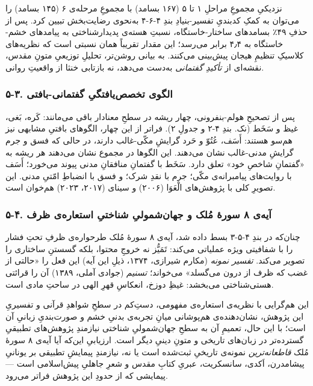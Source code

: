 \documentclass[12pt,a4paper]{article}
\begin{document}
\begin{RTL}
\begin{otherlanguage}{persian}
نزدیکیِ مجموعِ مراحلِ ۱ تا ۵ (۱۶۷ بسامد) با مجموعِ مرحله‌ی ۶ (۱۴۵ بسامد) را
می‌توان به کمکِ کدبندیِ تفسیر-بنیادِ بندِ ۴-۶-۴ به‌نحوی رضایت‌بخش تبیین کرد. پس
از حذفِ ۴۹٪ بسامدهای ساختار-خاستگاه، نسبتِ هسته‌ی پدیدارشناختی به پیامدهای
خشم-خاستگاه به ۴٫۴ برابر می‌رسد؛ این مقدار تقریباً همان نسبتی است که
نظریه‌های کلاسیکِ تنظیمِ هیجان پیش‌بینی می‌کنند. به بیانی روشن‌تر، تحلیلِ
توزیعیِ متونِ مقدس، نقشه‌ای از \emph{تأکیدِ گفتمانی} به‌دست می‌دهد، نه بازتابی
خنثا از واقعیتِ روانی.

\subsubsection{۵-۳. الگوی تخصص‌یافتگیِ
گفتمانی-بافتی}\label{ux627ux644ux6afux648ux6cc-ux62aux62eux635ux635ux6ccux627ux641ux62aux6afux6cc-ux6afux641ux62aux645ux627ux646ux6cc-ux628ux627ux641ux62aux6cc}

پس از تصحیحِ هولم-بنفرونی، چهار ریشه در سطحِ معنادار باقی می‌مانند: کَره،
بَغی، غیظ و سَخَط (نک. بندِ ۴-۲ و جدولِ ۲). فراتر از این چهار، الگوهای بافتیِ
مشابهی نیز هم‌سو هستند: أَسَف، عُتُوّ و حَرد گرایشِ مکّی-غالب دارند، در حالی که
فسق و جرم گرایشِ مدنی-غالب نشان می‌دهند. این الگوها در مجموع نشان می‌دهند
هر ریشه به «گفتمانِ شاخصِ خود» تعلق دارد. سَخَط با گفتمانِ منافقانِ مدنی پیوند
می‌خورد؛ أَسَف با روایت‌های پیامبرانه‌ی مکّی؛ جرم با نقدِ شرک؛ و فسق با انضباطِ
امّتیِ مدنی. این تصویرِ کلی با پژوهش‌های الْعَوَا (۲۰۰۶) و سینای (۲۰۱۷، ۲۰۲۳)
هم‌خوان است.

\subsubsection{۵-۴. آیه‌ی ۸ سورۀ مُلک و جهان‌شمولیِ شناختیِ استعاره‌ی
ظرف}\label{ux622ux6ccux647ux6cc-ux6f8-ux633ux648ux631ux6c0-ux645ux644ux6a9-ux648-ux62cux647ux627ux646ux634ux645ux648ux644ux6cc-ux634ux646ux627ux62eux62aux6cc-ux627ux633ux62aux639ux627ux631ux647ux6cc-ux638ux631ux641}

چنان‌که در بندِ ۴-۵-۳ بسط داده شد، آیه‌ی ۸ سورۀ مُلک طرحواره‌ی ظرفِ تحتِ فشار
را با شفافیتی ویژه عملیاتی می‌کند: تَمَیُّز نه خروجِ محتوا، بلکه گسستنِ ساختاری
را تصویر می‌کند. \emph{تفسیر نمونه} (مکارم شیرازی، ۱۳۷۴، ذیلِ این آیه) این
فعل را «حالتی از غضب که ظرف از درون می‌گسلد» می‌خواند؛ \emph{تسنیم} (جوادی
آملی، ۱۳۸۹) آن را قرائتی هستی‌شناختی می‌بخشد: غیظِ دوزخ، انعکاسِ قهرِ الهی در
ساحتِ مادی است.

این هم‌گرایی با نظریه‌ی استعاره‌ی مفهومی، دستِ‌کم در سطحِ شواهدِ قرآنی و تفسیریِ
این پژوهش، نشان‌دهنده‌ی هم‌پوشانی میانِ تجربه‌ی بدنیِ خشم و صورت‌بندیِ زبانیِ آن
است؛ با این حال، تعمیمِ آن به سطحِ جهان‌شمولیِ شناختی نیازمندِ پژوهش‌های
تطبیقیِ گسترده‌تر در زبان‌های تاریخی و متونِ دینیِ دیگر است. ارزیابیِ این‌که
آیا آیه‌ی ۸ سورۀ مُلک \emph{قاطعانه‌ترین} نمونه‌ی تاریخیِ ثبت‌شده است یا نه،
نیازمندِ پیمایشِ تطبیقی بر یونانیِ پیشامدرن، اَکدی، سانسکریت، عبریِ کتابِ مقدس
و شعرِ جاهلیِ پیش‌اسلامی است --- پیمایشی که از حدودِ این پژوهش فراتر می‌رود.


\end{otherlanguage}
\end{RTL}
\end{document}
